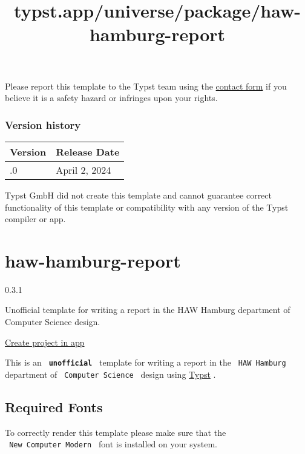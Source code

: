 Please report this template to the Typst team using the
\href{https://typst.app/contact}{contact form} if you believe it is a
safety hazard or infringes upon your rights.

\label{versions}
\subsubsection{Version history}\label{version-history}

\begin{longtable}[]{@{}ll@{}}
\toprule\noalign{}
Version & Release Date \\
\midrule\noalign{}
\endhead
\bottomrule\noalign{}
\endlastfoot
0.1.0 & April 2, 2024 \\
\end{longtable}

Typst GmbH did not create this template and cannot guarantee correct
functionality of this template or compatibility with any version of the
Typst compiler or app.


\title{typst.app/universe/package/haw-hamburg-report}

\label{banner}
\label{template-thumbnail}

\section{haw-hamburg-report}\label{haw-hamburg-report}

{ 0.3.1 }

Unofficial template for writing a report in the HAW Hamburg department
of Computer Science design.

\href{/app?template=haw-hamburg-report&version=0.3.1}{Create project in
app}

\label{readme}
This is an \textbf{\texttt{\ unofficial\ }} template for writing a
report in the \texttt{\ HAW\ Hamburg\ } department of
\texttt{\ Computer\ Science\ } design using
\href{https://github.com/typst/typst}{Typst} .

\subsection{Required Fonts}\label{required-fonts}

To correctly render this template please make sure that the
\texttt{\ New\ Computer\ Modern\ } font is installed on your system.

